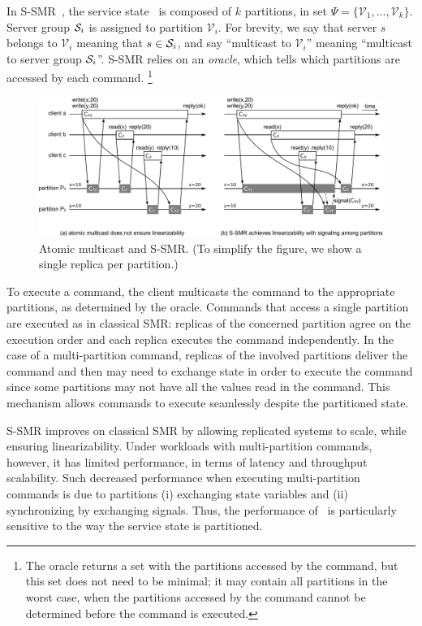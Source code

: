 In S-SMR~\cite{bezerra2014ssmr}, the service state \vvt\ is composed of $k$
partitions, in set $\Psi = \{\mathcal{V}_1, ..., \mathcal{V}_k\}$. Server group
$\mathcal{S}_i$ is assigned to partition $\mathcal{V}_i$. For brevity, we say that
server $s$ belongs to $\mathcal{V}_i$ meaning that $s \in \mathcal{S}_i$, and say
``multicast to $\mathcal{V}_i$'' meaning ``multicast to server group $\mathcal{S}_i$''.
S-SMR relies on an \emph{oracle}, which tells which partitions are accessed by
each command.
\footnote{The oracle returns a set with the partitions accessed
by the command, but this set does not need to be minimal; it may contain all
partitions in the worst case, when the partitions accessed by the command cannot
be determined before the command is executed.}

\begin{figure}
  \begin{minipage}[b]{1.0\linewidth}
  \centering
        \includegraphics[width=1\linewidth]{figures/ssmr}
  \end{minipage}
  \caption{Atomic multicast and S-SMR. (To simplify the figure, we show a single replica per partition.)}
  \label{fig:ssmr}
\end{figure}

To execute a command, the client multicasts the command to the appropriate
partitions, as determined by the oracle. Commands that access a single partition
are executed as in classical SMR: replicas of the concerned partition agree on
the execution order and each replica executes the command independently. In the
case of a multi-partition command, replicas of the involved partitions deliver
the command and then may need to exchange state in order to execute the command
since some partitions may not have all the values read in the command. This
mechanism allows commands to execute seamlessly despite the partitioned state.

S-SMR improves on classical SMR by allowing replicated systems to scale, while
ensuring linearizability. Under workloads with multi-partition commands,
however, it has limited performance, in terms of latency and throughput
scalability. Such decreased performance when executing multi-partition commands
is due to partitions (i) exchanging state variables and (ii) synchronizing by
exchanging signals. Thus, the performance of \ssmr\ is particularly
sensitive to the way the service state is partitioned.

